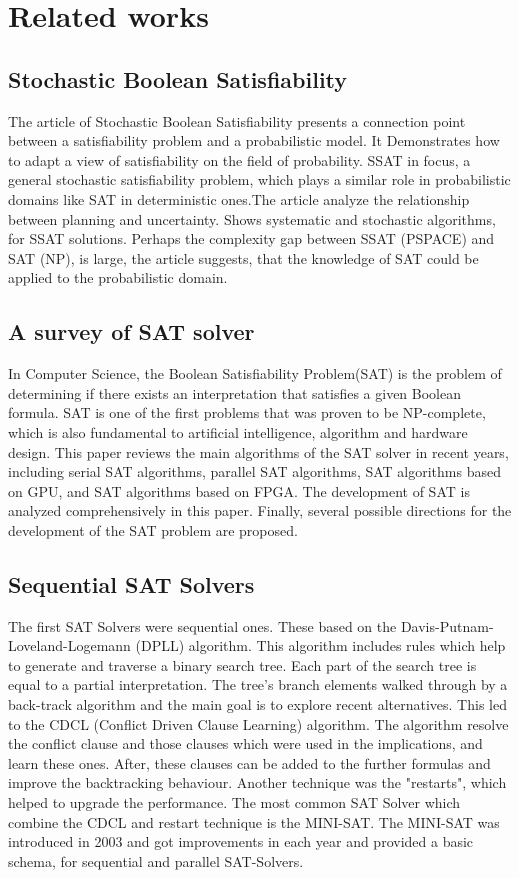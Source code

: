 \documentclass{article}
\begin{document}
\section{Related works}

\subsection{Stochastic Boolean Satisfiability}

The article of Stochastic Boolean Satisfiability presents a connection point between a satisfiability problem and a probabilistic model. It Demonstrates how to adapt a view of satisfiability on the field of probability. SSAT in focus, a general stochastic satisfiability problem, which plays a similar role in probabilistic domains like SAT in deterministic ones.The article analyze the relationship between planning and uncertainty. Shows systematic and stochastic algorithms, for SSAT solutions. Perhaps the complexity gap between SSAT (PSPACE) and SAT (NP), is large, the article suggests, that the knowledge of SAT could be applied to the probabilistic domain.

\subsection{A survey of SAT solver}

In Computer Science, the Boolean Satisfiability Problem(SAT) is the problem of determining if there exists an interpretation that satisfies a given Boolean formula. SAT is one of the first problems that was proven to be NP-complete, which is also fundamental to artificial intelligence, algorithm and hardware design. This paper reviews the main algorithms of the SAT solver in recent years, including serial SAT algorithms, parallel SAT algorithms, SAT algorithms based on GPU, and SAT algorithms based on FPGA. The development of SAT is analyzed comprehensively in this paper. Finally, several possible directions for the development of the SAT problem are proposed.

\subsection{Sequential SAT Solvers}

The first SAT Solvers were sequential ones. These based on the Davis-Putnam-Loveland-Logemann (DPLL) algorithm. This algorithm includes rules which help to generate and traverse a binary search tree. Each part of the search tree is equal to a partial interpretation. The tree's branch elements walked through by a back-track algorithm and the main goal is to explore recent alternatives. This led to the CDCL (Conflict Driven Clause Learning) algorithm. The algorithm resolve the conflict clause and those clauses which were used in the implications, and learn these ones. After, these clauses can be added to the further formulas and improve the backtracking behaviour. Another technique was the "restarts", which helped to upgrade the performance. The most common SAT Solver which combine the CDCL and restart technique is the MINI-SAT. The MINI-SAT was introduced in 2003 and got improvements in each year and provided a basic schema, for sequential and parallel SAT-Solvers.
\end{document}
